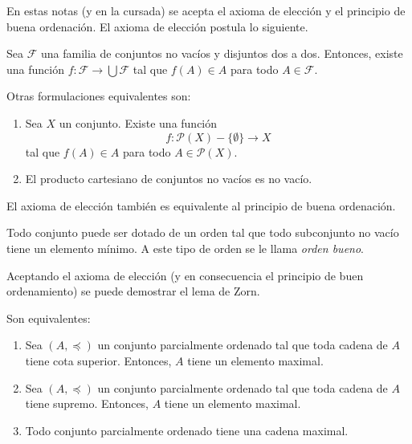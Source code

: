En estas notas (y en la cursada) se acepta el axioma de elección y el principio de buena ordenación. El axioma de elección postula lo siguiente.

\begin{axiom}
	Sea $\mathcal{F}$ una familia de conjuntos no vacíos y disjuntos dos a dos. Entonces, existe una función $f: \mathcal{F} \to \bigcup \mathcal{F}$ tal que $f(A) \in A$ para todo $A \in \mathcal{F}$.
\end{axiom}

Otras formulaciones equivalentes son:

\begin{enumerate}[label=(\roman*)]
	\item Sea $X$ un conjunto. Existe una función
	      \begin{equation*}
		      f: \mathcal{P}(X) - \{ \emptyset \} \to X
	      \end{equation*}
	      tal que $f(A) \in A$ para todo $A \in \mathcal{P}(X)$.
	\item El producto cartesiano de conjuntos no vacíos es no vacío.
\end{enumerate}

El axioma de elección también es equivalente al principio de buena ordenación.

\begin{axiom}
	Todo conjunto puede ser dotado de un orden tal que todo subconjunto no vacío tiene un elemento mínimo. A este tipo de orden se le llama \textit{orden bueno}.
\end{axiom}

Aceptando el axioma de elección (y en consecuencia el principio de buen ordenamiento) se puede demostrar el lema de Zorn.

\begin{axiom}
	Son equivalentes:
	\begin{enumerate}
		\item Sea $(A, \preceq)$ un conjunto parcialmente ordenado tal que toda cadena de $A$ tiene cota superior. Entonces, $A$ tiene un elemento maximal.
		\item Sea $(A, \preceq)$ un conjunto parcialmente ordenado tal que toda cadena de $A$ tiene supremo. Entonces, $A$ tiene un elemento maximal.
		\item Todo conjunto parcialmente ordenado tiene una cadena maximal.
	\end{enumerate}
\end{axiom}

